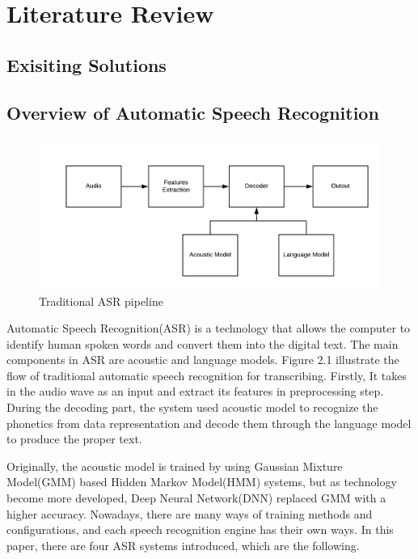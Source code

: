 \documentclass[natbib]{muthesis}
\begin{document}
  \chapter{Literature Review}
  
  \section{Exisiting Solutions}
  
  \section{Overview of Automatic Speech Recognition}
  
  \begin{figure}[H]
  	\centering
  	\captionsetup{justification=centering}
  	\includegraphics[width=0.9\linewidth]{images/traditional-asr}
  	\caption{Traditional ASR pipeline}
  	\label{fig:traditional-asr}
  \end{figure}
  Automatic Speech Recognition(ASR) is a technology that allows the computer to identify human spoken words and convert them into the digital text. The main components in ASR are acoustic and language models.
  Figure 2.1 illustrate the flow of traditional automatic speech recognition for transcribing.
  Firstly, It takes in the audio wave as an input and extract its features in preprocessing step. During the decoding part, the system used acoustic model to recognize the phonetics from data representation and decode them through the language model to produce the proper text. 
  
  Originally, the acoustic model is trained by using Gaussian Mixture Model(GMM) based Hidden Markov Model(HMM) systems, but as technology become more developed, Deep Neural Network(DNN) replaced GMM with a higher accuracy.\cite{Shivakumar_2019} Nowadays, there are many ways of training methods and configurations, and each speech recognition engine has their own ways. In this paper, there are four ASR systems introduced, which are the following.
\end{document}
